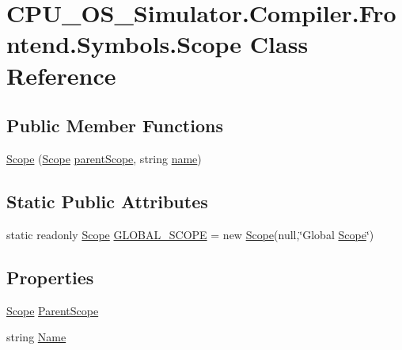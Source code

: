 \hypertarget{class_c_p_u___o_s___simulator_1_1_compiler_1_1_frontend_1_1_symbols_1_1_scope}{}\section{C\+P\+U\+\_\+\+O\+S\+\_\+\+Simulator.\+Compiler.\+Frontend.\+Symbols.\+Scope Class Reference}
\label{class_c_p_u___o_s___simulator_1_1_compiler_1_1_frontend_1_1_symbols_1_1_scope}
\subsection*{Public Member Functions}
\begin{DoxyCompactItemize}
\item 
\hyperlink{class_c_p_u___o_s___simulator_1_1_compiler_1_1_frontend_1_1_symbols_1_1_scope_ae8383693c3a694b25bd36c6223c1759c}{Scope} (\hyperlink{class_c_p_u___o_s___simulator_1_1_compiler_1_1_frontend_1_1_symbols_1_1_scope}{Scope} \hyperlink{class_c_p_u___o_s___simulator_1_1_compiler_1_1_frontend_1_1_symbols_1_1_scope_a537054d49f16d026d1200a3e54a0274e}{parent\+Scope}, string \hyperlink{class_c_p_u___o_s___simulator_1_1_compiler_1_1_frontend_1_1_symbols_1_1_scope_aae43a88c5f7b9933735cf177cbf413e0}{name})
\end{DoxyCompactItemize}
\subsection*{Static Public Attributes}
\begin{DoxyCompactItemize}
\item 
static readonly \hyperlink{class_c_p_u___o_s___simulator_1_1_compiler_1_1_frontend_1_1_symbols_1_1_scope}{Scope} \hyperlink{class_c_p_u___o_s___simulator_1_1_compiler_1_1_frontend_1_1_symbols_1_1_scope_a6083ac11708968b2d7cfc0720cf62648}{G\+L\+O\+B\+A\+L\+\_\+\+S\+C\+O\+P\+E} = new \hyperlink{class_c_p_u___o_s___simulator_1_1_compiler_1_1_frontend_1_1_symbols_1_1_scope}{Scope}(null,\char`\"{}Global \hyperlink{class_c_p_u___o_s___simulator_1_1_compiler_1_1_frontend_1_1_symbols_1_1_scope}{Scope}\char`\"{})
\end{DoxyCompactItemize}
\subsection*{Properties}
\begin{DoxyCompactItemize}
\item 
\hyperlink{class_c_p_u___o_s___simulator_1_1_compiler_1_1_frontend_1_1_symbols_1_1_scope}{Scope} \hyperlink{class_c_p_u___o_s___simulator_1_1_compiler_1_1_frontend_1_1_symbols_1_1_scope_abac9b9beb5da3ae1395d91d223889809}{Parent\+Scope}
\item 
string \hyperlink{class_c_p_u___o_s___simulator_1_1_compiler_1_1_frontend_1_1_symbols_1_1_scope_a6f4db261e3efb4e1313c6c25c84f6b42}{Name}
\end{DoxyCompactItemize}
